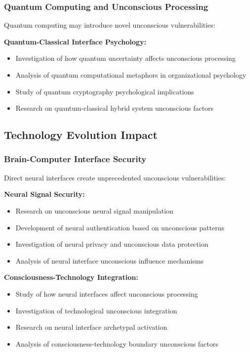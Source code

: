 \documentclass[11pt,a4paper]{article}
\begin{document}
\subsubsection{Quantum Computing and Unconscious Processing}

Quantum computing may introduce novel unconscious vulnerabilities:

\textbf{Quantum-Classical Interface Psychology:}
\begin{itemize}
\item Investigation of how quantum uncertainty affects unconscious processing
\item Analysis of quantum computational metaphors in organizational psychology
\item Study of quantum cryptography psychological implications
\item Research on quantum-classical hybrid system unconscious factors
\end{itemize}

\subsection{Technology Evolution Impact}

\subsubsection{Brain-Computer Interface Security}

Direct neural interfaces create unprecedented unconscious vulnerabilities:

\textbf{Neural Signal Security:}
\begin{itemize}
\item Research on unconscious neural signal manipulation
\item Development of neural authentication based on unconscious patterns
\item Investigation of neural privacy and unconscious data protection
\item Analysis of neural interface unconscious influence mechanisms
\end{itemize}

\textbf{Consciousness-Technology Integration:}
\begin{itemize}
\item Study of how neural interfaces affect unconscious processing
\item Investigation of technological unconscious integration
\item Research on neural interface archetypal activation
\item Analysis of consciousness-technology boundary unconscious factors
\end{itemize}
\end{document}
